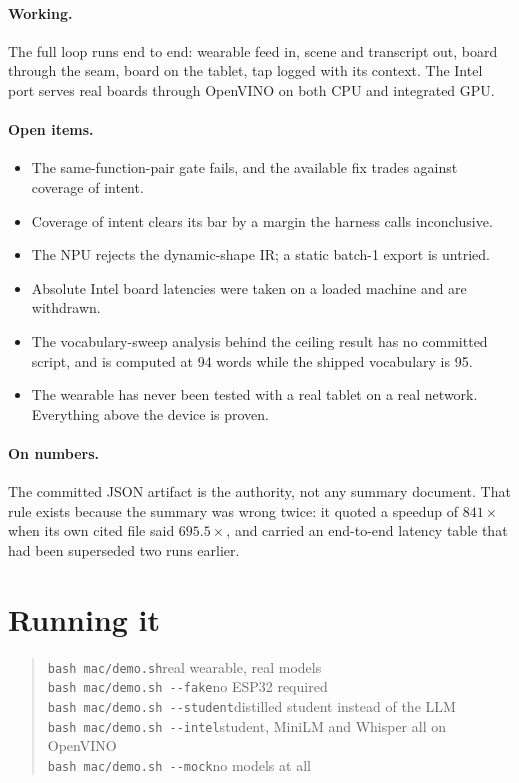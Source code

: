 \documentclass[11pt,a4paper]{article}
\newcommand{\code}[1]{\texttt{\small #1}}
\begin{document}
\paragraph{Working.} The full loop runs end to end: wearable feed in, scene and
transcript out, board through the seam, board on the tablet, tap logged with its
context. The Intel port serves real boards through OpenVINO on both CPU and integrated
GPU.

\paragraph{Open items.}
\begin{itemize}
  \item The same-function-pair gate fails, and the available fix trades against coverage
  of intent.
  \item Coverage of intent clears its bar by a margin the harness calls inconclusive.
  \item The NPU rejects the dynamic-shape IR; a static batch-1 export is untried.
  \item Absolute Intel board latencies were taken on a loaded machine and are withdrawn.
  \item The vocabulary-sweep analysis behind the ceiling result has no committed script,
  and is computed at 94 words while the shipped vocabulary is 95.
  \item The wearable has never been tested with a real tablet on a real network.
  Everything above the device is proven.
\end{itemize}

\paragraph{On numbers.} The committed JSON artifact is the authority, not any summary
document. That rule exists because the summary was wrong twice: it quoted a speedup of
$841\times$ when its own cited file said $695.5\times$, and carried an end-to-end latency
table that had been superseded two runs earlier.

\section{Running it}

\begin{quote}
\code{bash mac/demo.sh}\hfill real wearable, real models\\
\code{bash mac/demo.sh -{}-fake}\hfill no ESP32 required\\
\code{bash mac/demo.sh -{}-student}\hfill distilled student instead of the LLM\\
\code{bash mac/demo.sh -{}-intel}\hfill student, MiniLM and Whisper all on OpenVINO\\
\code{bash mac/demo.sh -{}-mock}\hfill no models at all
\end{quote}
\end{document}
